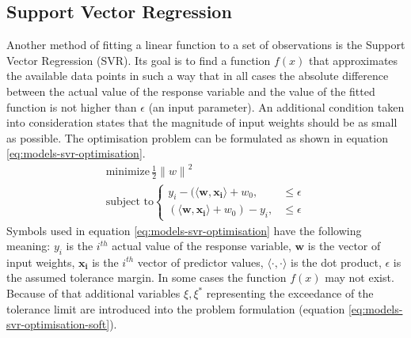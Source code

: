 \subsection{Support Vector Regression}
Another method of fitting a linear function to a set of observations is the Support Vector Regression (SVR). Its goal is to find a function $f(x)$ that approximates the available data points in such a way that in all cases the absolute difference between the actual value of the response variable and the value of the fitted function is not higher than $\epsilon$ (an input parameter). An additional condition taken into consideration states that the magnitude of input weights should be as small as possible. The optimisation problem can be formulated as shown in equation \ref{eq:models-svr-optimisation}.
\begin{equation}\label{eq:models-svr-optimisation}
\begin{gathered}
    \text{minimize}\, \frac{1}{2} {\lVert {w} \rVert}^2 \\
    \text{subject to}
    \begin{cases}
        y_i - (\langle \bm{w}, \bm{x_i} \rangle + w_0, & \leq \epsilon \\
        (\langle \bm{w}, \bm{x_i} \rangle + w_0) - y_i, & \leq \epsilon
    \end{cases}
\end{gathered}
\end{equation}
Symbols used in equation \ref{eq:models-svr-optimisation} have the following meaning: $y_i$ is the $i^{th}$ actual value of the response variable, $\bm{w}$ is the vector of input weights, $\bm{x_i}$ is the $i^{th}$ vector of predictor values, $\langle \cdot, \cdot \rangle$ is the dot product, $\epsilon$ is the assumed tolerance margin. 
In some cases the function $f(x)$ may not exist. Because of that additional variables $\xi, {\xi}^*$ representing the exceedance of the tolerance limit are introduced into the problem formulation (equation \ref{eq:models-svr-optimisation-soft}).

